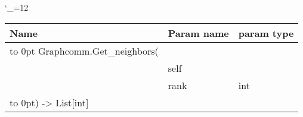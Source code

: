 \begingroup \catcode`\_=12 \tt
\begin{tabular}{lll}
\toprule
\textrm{Name}&\textrm{Param name}&\textrm{param type}\\
\midrule
\hbox to 0pt {Graphcomm.Get_neighbors(\hss}\\
& self\\
& rank & int\\
\hbox to 0pt{) -> List[int]\hss}\\
\bottomrule
\end{tabular}
\endgroup
